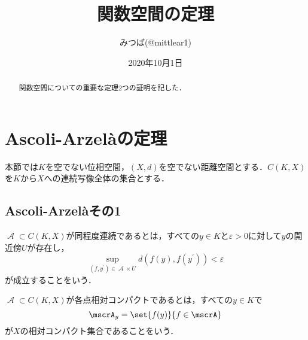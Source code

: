 \documentclass[uplatex]{jsarticle}
\title{関数空間の定理}
\author{みつば(@mittlear1)}
\date{2020年10月1日}
\begin{document}
\maketitle
\begin{abstract}
  \begin{center}
		関数空間についての重要な定理2つの証明を記した．
	\end{center}
\end{abstract}

\section{Ascoli-Arzel\`{a}の定理}
本節では$K$を空でない位相空間，$(X,d)$を空でない距離空間とする．$C(K,X)$を$K$から$X$への連続写像全体の集合とする．
\subsection{Ascoli-Arzel\`{a}その1}
\begin{definition}
$\mscrA\subset C(K,X)$が同程度連続であるとは，すべての$y\in K$と$\varepsilon > 0$に対して$y$の開近傍$U$が存在し，
\[ \sup_{(f,y^\prime)\in \mscrA\times U} d(f(y),f(y^\prime)) < \varepsilon \]
が成立することをいう．
\end{definition}

\begin{definition}
$\mscrA\subset C(K,X)$が各点相対コンパクトであるとは，すべての$y\in K$で
\[ \mscrA_y = \set{f(y)}{f\in \mscrA} \]
が$X$の相対コンパクト集合であることをいう．
\end{definition}
\end{document}
